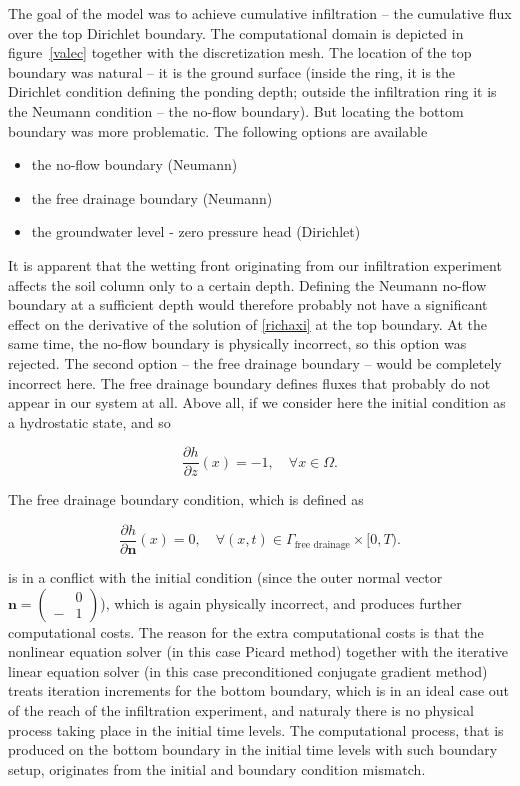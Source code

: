 \documentclass[review]{elsarticle}
\newenvironment{lineq}
    {\begin{linenomath*}
    \begin{equation}
    }
    { 
    \end{equation} 
    \end{linenomath*}
    }
\renewcommand{\vec}{\mathbf}
\begin{document}
The goal of the model was to achieve cumulative infiltration -- the cumulative flux over the top Dirichlet boundary.
The computational domain is depicted in figure~\ref{valec} together with the discretization mesh. The location of the top boundary was natural -- it is the ground surface (inside the ring, it is the Dirichlet condition defining the ponding depth; outside the infiltration ring it is the Neumann condition -- the no-flow boundary). But locating the bottom boundary was more problematic. The following options are available
\begin{itemize}
\item the no-flow boundary (Neumann)
\item the free drainage boundary (Neumann)
\item the groundwater level - zero pressure head (Dirichlet)
\end{itemize}
It is apparent that the wetting front originating from our infiltration experiment affects the soil column only to a certain depth. Defining the Neumann no-flow boundary at a sufficient depth would therefore probably not have a significant effect on the derivative of the solution of \eqref{richaxi} at the top boundary. At the same time, the no-flow boundary is physically incorrect, so this option was rejected. The second option -- the free drainage boundary -- would be completely incorrect here. The free drainage boundary defines fluxes that probably do not appear in our system at all. Above all, if we consider here the initial condition  as a hydrostatic state, and so \begin{lineq} \frac{\partial h}{\partial z}(x) = -1, \quad \forall x \in \Omega .\end{lineq} The free drainage boundary condition, which is defined as
\begin{lineq}
\frac{\partial h}{\partial \vec{n}}(x) = 0, \quad \forall (x,t) \in \Gamma_{\mbox{free drainage}} \times [0,T).
\end{lineq}
is in a conflict with the initial condition (since the outer normal vector $\vec{n} = \left(\begin{smallmatrix} &0 \\ -&1 \end{smallmatrix} \right)$), which is again physically incorrect, and produces further computational costs. The reason for the extra computational costs is that the nonlinear equation solver (in this case Picard method) together with the iterative linear equation solver (in this case preconditioned conjugate gradient method)  treats iteration increments for the bottom boundary, which is in an ideal case out of the reach of the infiltration experiment, and naturaly there is no physical process taking place in the initial time levels. The computational process, that is produced on the bottom boundary in the initial time levels with such boundary setup, originates from the initial and boundary condition mismatch. 
\end{document}
